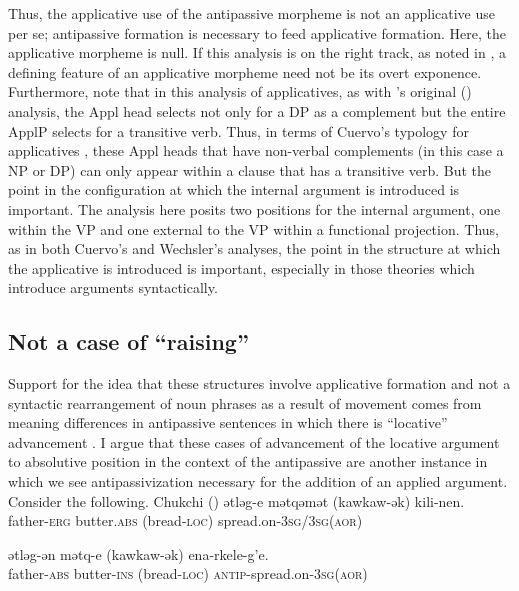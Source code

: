\documentclass[output=paper,colorlinks,citecolor=brown,modfonts,nonflat]{langsci/langscibook}
\begin{document}
Thus, the applicative use of the antipassive morpheme is not an applicative use per se; antipassive formation is necessary to feed applicative formation. Here, the applicative morpheme is null. If this analysis is on the right track, as noted in , a defining feature of an applicative morpheme need not be its overt exponence. Furthermore, note that in this analysis of applicatives, as with \citeauthor{Pyllkänen2008}'s original (\citeyear{Pyllkänen2008}) analysis, the Appl head selects not only for a DP as a complement but the entire ApplP selects for a transitive verb. Thus, in terms of Cuervo’s typology for applicatives , these Appl heads that have non-verbal complements (in this case a NP or DP) can only appear within a clause that has a transitive verb. But the point in the configuration at which the internal argument is introduced is important. The analysis here posits two positions for the internal argument, one within the VP and one external to the VP within a functional projection. Thus, as in both Cuervo’s  and Wechsler’s  analyses, the point in the structure at which the applicative is introduced is important, especially in those theories which introduce arguments syntactically.

\subsection{Not a case of ``raising''} %
\largerpage
Support for the idea that these structures involve applicative formation and not a syntactic rearrangement of noun phrases as a result of movement comes from meaning differences in antipassive sentences in which there is ``locative'' advancement \citep{PolinskajaNedjalkov1987}. I argue that these cases of advancement of the locative argument to absolutive position in the context of the antipassive are another instance in which we see antipassivization necessary for the addition of an applied argument. Consider the following.
\ea Chukchi (\citealt{PolinskajaNedjalkov1987})   \label{ex:basilico:10}
	\ea \label{ex:basilico:10a}
	\gll ətləg-e  mətqəmət  (kawkaw-ək)  kili-nen.\\
	father-\textsc{{erg}}  butter.\textsc{{abs}}  (bread-\textsc{loc})   {spread.on}-3\textsc{sg}/3\textsc{sg}(\textsc{{aor}})\\
	\glt

	\ex \label{ex:basilico:10b}
	\gll ətləg-ən  mətq-e  (kawkaw-ək)  ena-rkele-g’e.\\
	father-\textsc{{abs}}  butter-\textsc{{ins}}  (bread-\textsc{loc})  \textsc{antip}{}-{spread.on}-3\textsc{sg}(\textsc{{aor}})\\
	\glt
\end{document}
